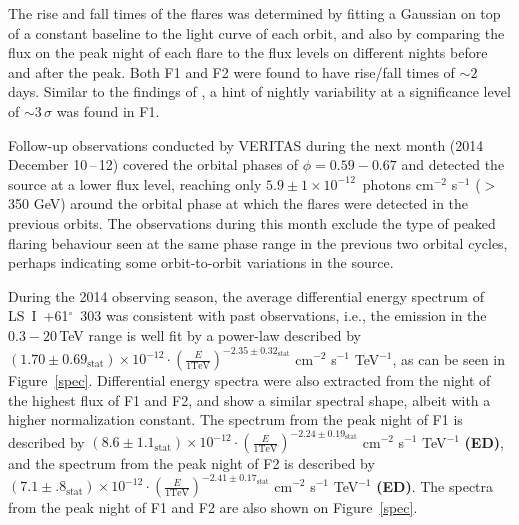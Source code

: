 \documentclass[preprint2]{aastex}
\newcommand{\pflux}{~photons cm$^{-2}$ s$^{-1}$}
\newcommand{\lsi}{LS~I~+61$^{\circ}$~303}
\newcommand{\tev}{\,TeV}
\begin{document}
The rise and fall times of the flares was determined by fitting a Gaussian on top of a constant baseline to the light curve of each orbit, and also by comparing the flux on the peak night of each flare to the flux levels on different nights before and after the peak. Both F1 and F2 were found to have rise/fall times of $\sim2$ days. Similar to the findings of \cite{2013ApJ...779...88A}, a hint of nightly variability at a significance level of \textbf{$\sim3\,\sigma$} was found in F1.

Follow-up observations conducted by VERITAS during the next month (2014 December 10\,--\,12) covered the orbital phases of $\phi=0.59-0.67$ and detected the source at a lower flux level, reaching only $5.9 \pm 1 \times10^{-12}$\pflux{} ($>$350 GeV) around the orbital phase at which the flares were detected in the previous orbits. The observations during this month exclude the type of peaked flaring behaviour seen at the same phase range in the previous two orbital cycles, perhaps indicating some orbit-to-orbit variations in the source.


During the 2014 observing season, the average differential energy spectrum of \lsi{} was consistent with past observations, i.e., the emission in the $0.3-20$\tev{} range is well fit by a power-law described by $\left( 1.70 \pm 0.69_{\mathrm{stat}} \right) \times 10^{-12} \cdot \left( \frac{E}{\mathrm{1 TeV}} \right)^{-2.35 \pm 0.32_{\mathrm{stat}}}$ cm$^{-2}$ s$^{-1}$ TeV$^{-1}$, as can be seen in Figure~\ref{spec}. Differential energy spectra were also extracted from the night of the highest flux of F1 and F2, and show a similar spectral shape, albeit with a higher normalization constant. The spectrum from the peak night of F1 is described by $\left( 8.6 \pm 1.1_{\mathrm{stat}} \right) \times 10^{-12} \cdot \left( \frac{E}{\mathrm{1 TeV}} \right)^{-2.24 \pm 0.19_{\mathrm{stat}}}$ cm$^{-2}$ s$^{-1}$ TeV$^{-1}$ \textbf{(ED)}, and the spectrum from the peak night of F2 is described by $\left( 7.1 \pm .8_{\mathrm{stat}} \right) \times 10^{-12} \cdot \left( \frac{E}{\mathrm{1 TeV}} \right)^{-2.41 \pm 0.17_{\mathrm{stat}}}$ cm$^{-2}$ s$^{-1}$ TeV$^{-1}$ \textbf{(ED)}. The spectra from the peak night of F1 and F2 are also shown on Figure~\ref{spec}.
\end{document}
